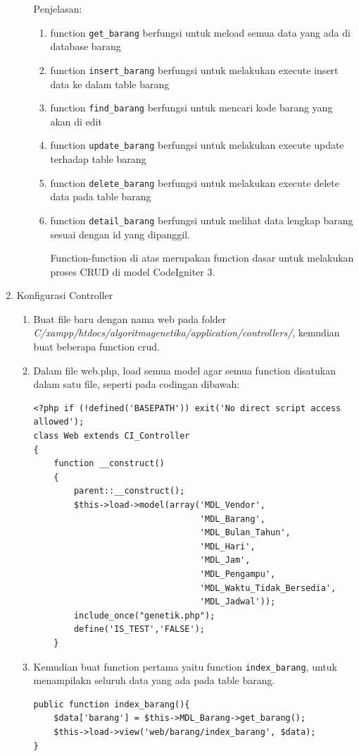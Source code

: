 \begin{enumerate}
\begin{enumerate}
        \par Penjelasan:
        \begin{enumerate}
            \item function \verb|get_barang| berfungsi untuk meload semua data yang ada di database barang
            \item function \verb|insert_barang| berfungsi untuk melakukan execute insert data ke dalam table barang
            \item function \verb|find_barang| berfungsi untuk mencari kode barang yang akan di edit
            \item function \verb|update_barang| berfungsi untuk melakukan execute update terhadap table barang
            \item function \verb|delete_barang| berfungsi untuk melakukan execute delete data pada table barang
            \item function \verb|detail_barang| berfungsi untuk melihat data lengkap barang sesuai dengan id yang dipanggil.
            
            \par Function-function di atas merupakan function dasar untuk melakukan proses CRUD di model CodeIgniter 3.
        \end{enumerate}
    \end{enumerate}
    
    \item Konfigurasi Controller
    \begin{enumerate}
        \item Buat file baru dengan nama web pada folder \textit{C/xampp/htdocs/algoritmagenetika/application/controllers/}, kemudian buat beberapa function crud.
        \item Dalam file web.php, load semua model agar semua function disatukan dalam satu file, seperti pada codingan dibawah:
\begin{lstlisting}
<?php if (!defined('BASEPATH')) exit('No direct script access allowed');
class Web extends CI_Controller
{
	function __construct()
    {
        parent::__construct();
		$this->load->model(array('MDL_Vendor',
								 'MDL_Barang',
								 'MDL_Bulan_Tahun',
								 'MDL_Hari',
								 'MDL_Jam',
								 'MDL_Pengampu',
								 'MDL_Waktu_Tidak_Bersedia',
								 'MDL_Jadwal'));
		include_once("genetik.php");
		define('IS_TEST','FALSE');
    }
\end{lstlisting}
    		
    	\item Kemudian buat function pertama yaitu function \verb|index_barang|, untuk menampilakn seluruh data yang ada pada table barang.
\begin{lstlisting}
public function index_barang(){
    $data['barang'] = $this->MDL_Barang->get_barang();
    $this->load->view('web/barang/index_barang', $data);
}
\end{lstlisting}
    		

\end{enumerate}
\end{enumerate}
